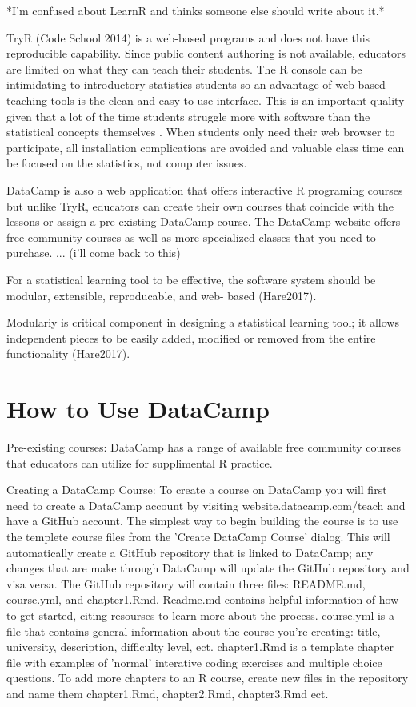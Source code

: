 \documentclass{tise_style}
\begin{document}
*I'm confused about LearnR and thinks someone else should write about it.*

TryR (Code School 2014) is a web-based programs and does not have this reproducible capability. Since public content authoring is not available, educators are limited on what they can teach their students. The R console can be intimidating to introductory statistics students so an advantage of web-based teaching tools is 
the clean and easy to use interface. This is an important quality given that a lot of the time students struggle more with 
software than the statistical concepts themselves \citep{Hare2017}. When students only need their web browser to participate,
all installation complications are avoided and valuable class time can be focused on the statistics, not computer issues.


DataCamp is also a web application that offers interactive R programing courses but unlike TryR, educators can 
create their own courses that coincide with the lessons or assign a pre-existing DataCamp course. The DataCamp website offers 
free community courses as well as more specialized classes that you need to purchase. ... (i'll come back to this)

For a statistical learning tool to be effective, the software system should be modular, extensible, reproducable, and web-
based (Hare2017). 

Modulariy is critical component in designing a statistical learning tool; it allows independent pieces to be easily added, 
modified or removed from the entire functionality (Hare2017). 

\section{How to Use DataCamp}
Pre-existing courses:
DataCamp has a range of available free community courses that educators can utilize for supplimental R practice.


Creating a DataCamp Course:
To create a course on DataCamp you will first need to create a DataCamp account by visiting website\www.datacamp.com/teach and
have a GitHub account. The simplest way to begin building the course is to use the templete course files from the 'Create
DataCamp Course' dialog. This will automatically create a GitHub repository that is linked to DataCamp; any changes that are 
make through DataCamp will update the GitHub repository and visa versa. The GitHub repository will contain three files: 
README.md, course.yml, and chapter1.Rmd.
Readme.md contains helpful information of how to get started, citing resourses to learn more about the process. 
course.yml is a file that contains general information about the course you're creating: title, university, description, 
difficulty level, ect.  
chapter1.Rmd is a template chapter file with examples of 'normal' interative coding exercises and multiple choice questions.
To add more chapters to an R course, create new files in the repository and name them chapter1.Rmd, chapter2.Rmd, chapter3.Rmd
ect.
\end{document}
